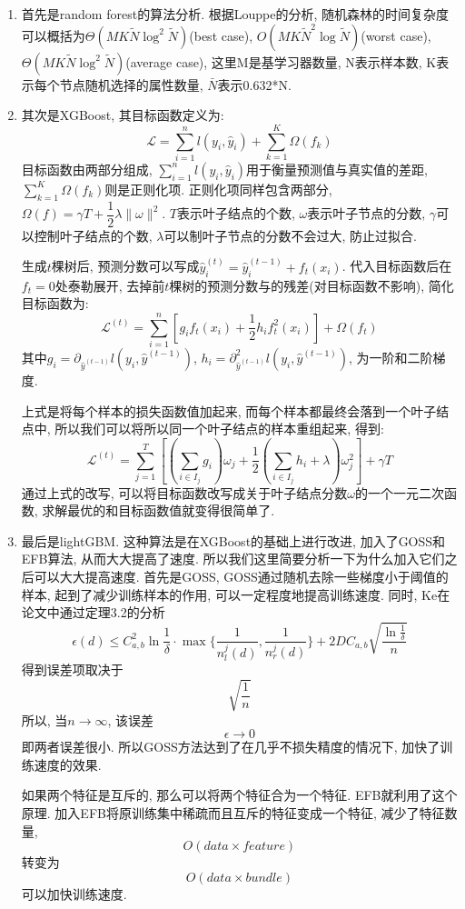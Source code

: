 \documentclass[a4paper,UTF8]{article}
\begin{document}
\begin{enumerate}
  \item 首先是random forest的算法分析. 根据Louppe\cite{ref4}的分析, 随机森林的时间复杂度可以概括为$\Theta(MK\tilde{N}\log^2\tilde{N})$(best case), $O(MK\tilde{N}^2\log\tilde{N})$(worst case), $\Theta(MK\tilde{N}\log^2\tilde{N})$(average case), 这里M是基学习器数量, N表示样本数, K表示每个节点随机选择的属性数量, $\bar{N}$表示0.632*N.
  \item 其次是XGBoost, 其目标函数定义为: 
  $$\mathcal{L}=\sum_{i=1}^nl(y_i,\hat{y}_i)+\sum_{k=1}^K\Omega(f_k)$$
  目标函数由两部分组成, $\sum_{i=1}^nl(y_i,\hat{y}_i)$用于衡量预测值与真实值的差距, $\sum_{k=1}^K\Omega(f_k)$则是正则化项. 正则化项同样包含两部分, $\Omega(f)=\gamma T+\dfrac{1}{2}\lambda\|\omega\|^2$. $T$表示叶子结点的个数, $\omega$表示叶子节点的分数, $\gamma$可以控制叶子结点的个数, $\lambda$可以制叶子节点的分数不会过大, 防止过拟合.
  
  生成$t$棵树后, 预测分数可以写成$\hat{y}_i^{(t)}=\hat{y}_i^{(t-1)}+f_t(x_i)$. 代入目标函数后在$f_t=0$处泰勒展开, 去掉前$t$棵树的预测分数与​的残差(对目标函数不影响), 简化目标函数为:
  $$\mathcal{L}^{(t)}=\sum_{i=1}^n\left[g_if_t(x_i)+\dfrac{1}{2}h_if_t^2(x_i)\right]+\Omega(f_t)$$
  其中$g_i=\partial_{\hat{y}^{(t-1)}}l(y_i,\hat{y}^{(t-1)})$, $h_i=\partial^2_{\hat{y}^{(t-1)}}l(y_i,\hat{y}^{(t-1)})$, 为一阶和二阶梯度.
  
  上式是将每个样本的损失函数值加起来, 而每个样本都最终会落到一个叶子结点中, 所以我们可以将所以同一个叶子结点的样本重组起来, 得到:
  $$\mathcal{L}^{(t)}=\sum_{j=1}^{T}\left[\left(\sum_{i\in I_j}g_i\right)\omega_j+\dfrac{1}{2}\left(\sum_{i\in I_j}h_i+\lambda\right)\omega_j^2\right]+\gamma T$$
  通过上式的改写, 可以将目标函数改写成关于叶子结点分数$\omega$的一个一元二次函数, 求解最优的​和目标函数值就变得很简单了.
  \item 最后是lightGBM. 这种算法是在XGBoost的基础上进行改进, 加入了GOSS和EFB算法, 从而大大提高了速度. 所以我们这里简要分析一下为什么加入它们之后可以大大提高速度. 首先是GOSS, GOSS通过随机去除一些梯度小于阈值的样本, 起到了减少训练样本的作用, 可以一定程度地提高训练速度. 同时, Ke\cite{ref3}在论文中通过定理3.2的分析
  $$\epsilon (d) \leq C_{a,b}^2 \ln \frac{1}{\delta} \cdot \max\{ \frac{1}{n_{l}^{j}(d) },\frac{1}{n_{r}^{j}(d)}\}+2DC_{a,b}\sqrt{ \frac{\ln{\frac{1}{\delta}}}{n}}$$
  得到误差项取决于
  $$\sqrt{\frac{1}{n}}$$
  所以, 当$n \rightarrow \infty$, 该误差
  $$\epsilon \rightarrow 0$$
  即两者误差很小. 所以GOSS方法达到了在几乎不损失精度的情况下, 加快了训练速度的效果. 
  
  如果两个特征是互斥的, 那么可以将两个特征合为一个特征. EFB就利用了这个原理. 加入EFB将原训练集中稀疏而且互斥的特征变成一个特征, 减少了特征数量, 
  $$O(data \times feature)$$
  转变为
  $$O(data \times bundle)$$
  可以加快训练速度.
\end{enumerate}
\end{document}
